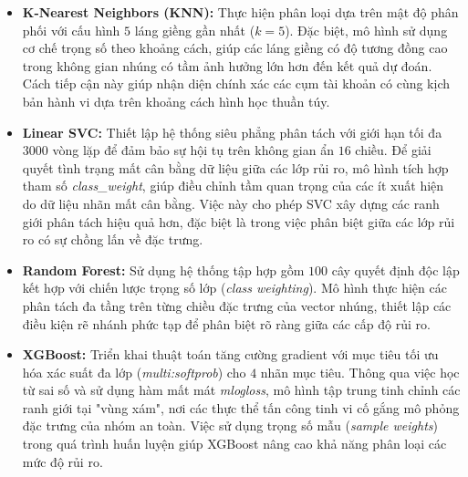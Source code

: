 \begin{itemize}[label={--}, itemsep=1pt]
    \item \textbf{K-Nearest Neighbors (KNN):} Thực hiện phân loại dựa trên mật độ phân phối với cấu hình $5$ láng giềng gần nhất ($k=5$). Đặc biệt, mô hình sử dụng cơ chế trọng số theo khoảng cách, giúp các láng giềng có độ tương đồng cao trong không gian nhúng có tầm ảnh hưởng lớn hơn đến kết quả dự đoán. Cách tiếp cận này giúp nhận diện chính xác các cụm tài khoản có cùng kịch bản hành vi dựa trên khoảng cách hình học thuần túy.
    
    \item \textbf{Linear SVC:} Thiết lập hệ thống siêu phẳng phân tách với giới hạn tối đa $3000$ vòng lặp để đảm bảo sự hội tụ trên không gian ẩn $16$ chiều. Để giải quyết tình trạng mất cân bằng dữ liệu giữa các lớp rủi ro, mô hình tích hợp tham số \textit{class\_weight}, giúp điều chỉnh tầm quan trọng của các ít xuất hiện do dữ liệu nhãn mất cân bằng. Việc này cho phép SVC xây dựng các ranh giới phân tách hiệu quả hơn, đặc biệt là trong việc phân biệt giữa các lớp rủi ro có sự chồng lấn về đặc trưng.
    
    \item \textbf{Random Forest:} Sử dụng hệ thống tập hợp gồm $100$ cây quyết định độc lập kết hợp với chiến lược trọng số lớp (\textit{class weighting}). Mô hình thực hiện các phân tách đa tầng trên từng chiều đặc trưng của vector nhúng, thiết lập các điều kiện rẽ nhánh phức tạp để phân biệt rõ ràng giữa các cấp độ rủi ro.
    
    \item \textbf{XGBoost:} Triển khai thuật toán tăng cường gradient với mục tiêu tối ưu hóa xác suất đa lớp (\textit{multi:softprob}) cho $4$ nhãn mục tiêu. Thông qua việc học từ sai số và sử dụng hàm mất mát \textit{mlogloss}, mô hình tập trung tinh chỉnh các ranh giới tại "vùng xám", nơi các thực thể tấn công tinh vi cố gắng mô phỏng đặc trưng của nhóm an toàn. Việc sử dụng trọng số mẫu (\textit{sample weights}) trong quá trình huấn luyện giúp XGBoost nâng cao khả năng phân loại các mức độ rủi ro.
\end{itemize}